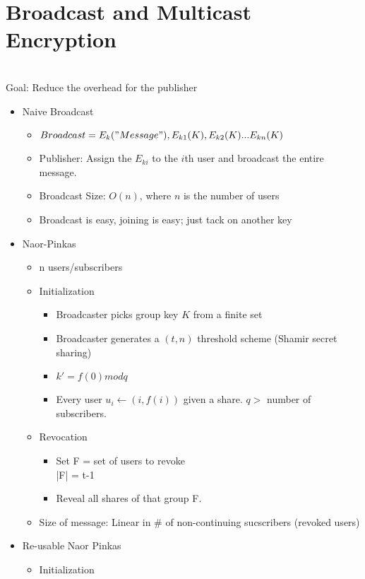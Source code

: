 \section{Broadcast and Multicast Encryption}
\\Goal: Reduce the overhead for the publisher
\begin{itemize}
\item Naive Broadcast
    \begin{itemize}
    \item $Broadcast = E_k("Message"), E_{k1}(K), E_{k2}(K) ... E_{kn}(K)$
    \item Publisher: Assign the $E_{ki}$ to the $i$th user and broadcast the entire message.
    \item Broadcast Size: $O(n)$, where $n$ is the number of users
    \item Broadcast is easy, joining is easy; just tack on another key
    \end{itemize}
\item Naor-Pinkas
    \begin{itemize}
    \item n users/subscribers
    \item Initialization
        \begin{itemize}
        \item Broadcaster picks group key $K$ from a finite set
        \item Broadcaster generates a $(t,n)$ threshold scheme (Shamir secret sharing)
        \item $k' = f(0) mod q$
        \item Every user $u_i \leftarrow (i,f(i))$ given a share. $q > $ number of subscribers.
        \end{itemize}
    \item Revocation
        \begin{itemize}
        \item Set F = set of users to revoke
        \\|F| = t-1
        \item Reveal all shares of that group F. 
        \end{itemize}
    \item Size of message: Linear in # of non-continuing sucscribers (revoked users)
    \end{itemize}
\item Re-usable Naor Pinkas
    \begin{itemize}
    \item Initialization

\end{itemize}
\end{itemize}
